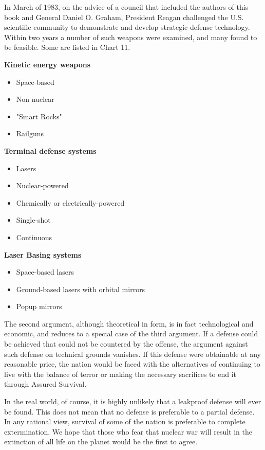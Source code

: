 \begin{mdframed}[backgroundcolor=black!10]
In March of 1983, on the advice of a council that included the authors of this book and General Daniel O. Graham, President Reagan challenged the U.S. scientific community to demonstrate and develop strategic defense technology. Within two years a number of such weapons were examined, and many found to be feasible. Some are listed in Chart 11.
\end{mdframed}

\begin{mdframed}[frametitle={CHART 11: Potential Strategic Defense Systems}]
\textbf{Kinetic energy weapons}
    \begin{itemize}
        \item Space-based
        \item Non nuclear
        \item "Smart Rocks"
        \item Railguns
    \end{itemize}
\textbf{Terminal defense systems}
    \begin{itemize}
        \item Lasers
        \item Nuclear-powered
        \item Chemically or electrically-powered
        \item Single-shot 
        \item Continuous
    \end{itemize}
\textbf{Laser Basing systems}
    \begin{itemize}
        \item Space-based lasers
        \item Ground-based lasers with orbital mirrors
        \item Popup mirrors
    \end{itemize}
\end{mdframed}

The second argument, although theoretical in form, is in fact technological and economic, and reduces to a special case of the third argument. If a defense could be achieved that could not be countered by the offense, the argument against such defense on technical grounds vanishes. If this defense were obtainable at any reasonable price, the nation would be faced with the alternatives of continuing to live with the balance of terror or making the necessary sacrifices to end it through Assured Survival.

In the real world, of course, it is highly unlikely that a leakproof defense will ever be found. This does not mean that no defense is preferable to a partial defense. In any rational view, survival of some of the nation is preferable to complete extermination. We hope that those who fear that nuclear war will result in the extinction of all life on the planet would be the first to agree.

